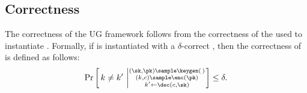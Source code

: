     \subsection{Correctness}
    The correctness of the UG framework follows from the correctness of the
    \kem used to instantiate \ug.
    Formally, if \ug is instantiated with a $\delta$-correct \kem, then the
    correctness of \ug is defined as follows:
    \[
        \Pr \left[\,  k \ne k' \, \left | \substack{(\sk, \pk) \sample \keygen(\,) \\ (k, c) \sample \enc(\pk) \\ k' \gets \dec(c, \sk) } \right. \right] \le \delta .
    \]
